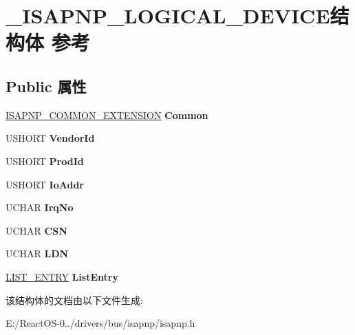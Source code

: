 \hypertarget{struct___i_s_a_p_n_p___l_o_g_i_c_a_l___d_e_v_i_c_e}{}\section{\+\_\+\+I\+S\+A\+P\+N\+P\+\_\+\+L\+O\+G\+I\+C\+A\+L\+\_\+\+D\+E\+V\+I\+C\+E结构体 参考}
\label{struct___i_s_a_p_n_p___l_o_g_i_c_a_l___d_e_v_i_c_e}
\subsection*{Public 属性}
\begin{DoxyCompactItemize}
\item 
\mbox{\label{struct___i_s_a_p_n_p___l_o_g_i_c_a_l___d_e_v_i_c_e_abb16392640323a284bf4f0be4f477ed9}} 
\hyperlink{struct___i_s_a_p_n_p___c_o_m_m_o_n___e_x_t_e_n_s_i_o_n}{I\+S\+A\+P\+N\+P\+\_\+\+C\+O\+M\+M\+O\+N\+\_\+\+E\+X\+T\+E\+N\+S\+I\+ON} {\bfseries Common}
\item 
\mbox{\label{struct___i_s_a_p_n_p___l_o_g_i_c_a_l___d_e_v_i_c_e_a082ec92d7d74d0ee24b1be280e4a0965}} 
U\+S\+H\+O\+RT {\bfseries Vendor\+Id}
\item 
\mbox{\label{struct___i_s_a_p_n_p___l_o_g_i_c_a_l___d_e_v_i_c_e_a21273254facd9aa6be2fcab4b3af2e52}} 
U\+S\+H\+O\+RT {\bfseries Prod\+Id}
\item 
\mbox{\label{struct___i_s_a_p_n_p___l_o_g_i_c_a_l___d_e_v_i_c_e_ac436c5107529fac2d78eb27e6d93ac6a}} 
U\+S\+H\+O\+RT {\bfseries Io\+Addr}
\item 
\mbox{\label{struct___i_s_a_p_n_p___l_o_g_i_c_a_l___d_e_v_i_c_e_ac3c9df64616cf5182408a9e5a1e127d6}} 
U\+C\+H\+AR {\bfseries Irq\+No}
\item 
\mbox{\label{struct___i_s_a_p_n_p___l_o_g_i_c_a_l___d_e_v_i_c_e_ad8be0d0bc897adff9e2af72a867d041d}} 
U\+C\+H\+AR {\bfseries C\+SN}
\item 
\mbox{\label{struct___i_s_a_p_n_p___l_o_g_i_c_a_l___d_e_v_i_c_e_a8a856fd0a8253c82b78700316d9840ff}} 
U\+C\+H\+AR {\bfseries L\+DN}
\item 
\mbox{\label{struct___i_s_a_p_n_p___l_o_g_i_c_a_l___d_e_v_i_c_e_a2d2b35b463675bb67f4e19c5d9454829}} 
\hyperlink{struct___l_i_s_t___e_n_t_r_y}{L\+I\+S\+T\+\_\+\+E\+N\+T\+RY} {\bfseries List\+Entry}
\end{DoxyCompactItemize}


该结构体的文档由以下文件生成\+:\begin{DoxyCompactItemize}
\item 
E\+:/\+React\+O\+S-\/0../drivers/bus/isapnp/isapnp.\+h\end{DoxyCompactItemize}
